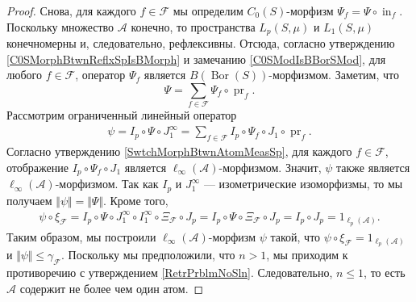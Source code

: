\documentclass[12pt]{article}
\begin{document}
\begin{proof}
    Снова, для каждого $f\in\mathcal{F}$ мы определим 
    $C_0(S)$-морфизм $\Psi_f=\Psi\circ \operatorname{in}_f$. 
    Поскольку множество $\mathcal{A}$ конечно, то пространства $L_p(S,\mu)$ 
    и $L_1(S,\mu)$ конечномерны и, следовательно, рефлексивны. 
    Отсюда, согласно утверждению \ref{C0SMorphBtwnReflxSpIsBMorph} и 
    замечанию \ref{C0SModIsBBorSMod}, для любого $f\in\mathcal{F}$, 
    оператор $\Psi_f$ является $B(\operatorname{Bor}(S))$-морфизмом. 
    Заметим, что
    \[
        \Psi=\sum_{f\in\mathcal{F}} \Psi_f\circ\operatorname{pr}_f.
    \]
    Рассмотрим ограниченный линейный оператор
    \[
    \begin{aligned}
        \psi
        =I_p\circ\Psi\circ J_1^\infty
        =\sum_{f\in\mathcal{F}} 
            I_p\circ\Psi_f\circ J_1\circ\operatorname{pr}_f.
    \end{aligned} 
    \]
    Согласно утверждению \ref{SwtchMorphBtwnAtomMeasSp}, для 
    каждого $f\in \mathcal{F}$, отображение $I_p\circ \Psi_f\circ J_1$ является 
    $\ell_\infty(\mathcal{A})$-морфизмом. Значит, $\psi$ также является 
    $\ell_\infty(\mathcal{A})$-морфизмом. Так как $I_p$ 
    и $J_1^{\infty}$ --- изометрические изоморфизмы, то мы 
    получаем $\Vert\psi\Vert=\Vert\Psi\Vert$. Кроме того,
    \[
    \begin{aligned}
        \psi\circ\xi_\mathcal{F}
        = I_p\circ\Psi\circ J_1^{\infty}\circ 
            I_1^{\infty}\circ \Xi_{\mathcal{F}}\circ J_p
        = I_p\circ\Psi\circ \Xi_{\mathcal{F}}\circ J_p
        = I_p\circ J_p
        = 1_{\ell_p(\mathcal{A})}.
    \end{aligned}
    \]
    Таким образом, мы построили $\ell_\infty(\mathcal{A})$-морфизм $\psi$
    такой, что $\psi\circ\xi_{\mathcal{F}}=1_{\ell_p(\mathcal{A})}$ 
    и $\Vert \psi\Vert\leq\gamma_{\mathcal{F}}$. Поскольку мы предположили, 
    что $n>1$, мы приходим к противоречию с утверждением \ref{RetrPrblmNoSln}. 
    Следовательно, $n\leq 1$, то есть $\mathcal{A}$ содержит не более чем один 
    атом.
\end{proof}
\end{document}
